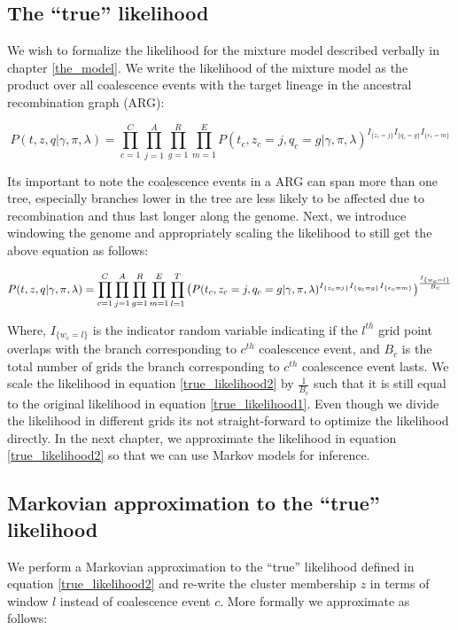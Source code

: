 \subsection{The ``true'' likelihood}
We wish to formalize the likelihood for the mixture model described verbally in chapter \ref{the_model}. We write the likelihood of the mixture model as the product over all coalescence events with the target lineage in the ancestral recombination graph (ARG): 

\begin{equation}
    P (t,z,q \vert \gamma, \pi, \lambda) = \prod_{c=1}^{C} \prod_{j = 1}^A \prod_{g =1}^{R} \prod_{m = 1}^E P (t_c,z_c = j,q_c=g \vert \gamma, \pi, \lambda)^{I_{\{z_c = j\}} I_{\{q_c = g\}} I_{\{e_c = m\}}}
\label{true_likelihood1}
\end{equation}

Its important to note the coalescence events in a ARG can span more than one tree, especially branches lower in the tree are less likely to be affected due to recombination and thus last longer along the genome. Next, we introduce windowing the genome and appropriately scaling the likelihood to still get the above equation as follows:

\begin{equation}
    \footnotesize
    P(t,z,q \vert \gamma, \pi, \lambda) = \prod_{c=1}^{C} \prod_{j = 1}^A \prod_{g =1}^{R} \prod_{m = 1}^E \prod_{l =1}^{T} \left( P(t_c,z_c = j,q_c=g \vert \gamma, \pi, \lambda)^{I_{\{z_c = j\}} I_{\{q_c = g\}} I_{\{e_c = m\}}} \right) ^{\frac{I_{\{w_c = l\}}}{B_c}}
\label{true_likelihood2}
\end{equation}

Where, $I_{\{w_c = l\}}$ is the indicator random variable indicating if the $l^{th}$ grid point overlaps with the branch corresponding to $c^{th}$ coalescence event, and $B_c$ is the total number of grids the branch corresponding to $c^{th}$ coalescence event lasts. We scale the likelihood in equation \ref{true_likelihood2} by $\frac{1}{B_c}$ such that it is still equal to the original likelihood in equation \ref {true_likelihood1}. Even though we divide the likelihood in different grids its not straight-forward to optimize the likelihood directly. In the next chapter, we approximate the likelihood in equation \ref{true_likelihood2} so that we can use Markov models for inference. 


\subsection{Markovian approximation to the ``true'' likelihood}
We perform a Markovian approximation to the ``true'' likelihood defined in equation \ref{true_likelihood2} and re-write the cluster membership $z$ in terms of window $l$ instead of coalescence event $c$. More formally we approximate as follows:

